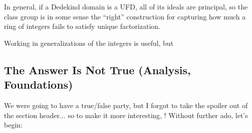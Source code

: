 \documentclass[12pt]{article}
\begin{document}
In general, if a Dedekind domain is a UFD, all of its ideals are principal, so
the class group is in some sense the ``right'' construction for capturing how
much a ring of integers fails to satisfy unique factorization.   
\setcounter{idea}{0}
\begin{idea}
  Working in generalizations of the integers is useful, but 
\end{idea}

\subsection{The Answer Is Not True (Analysis, Foundations)}
We were going to have a true/false party, but I forgot to take the spoiler out
of the section header... so to make it more interesting, ! Without further ado, let's begin: 
\end{document}
